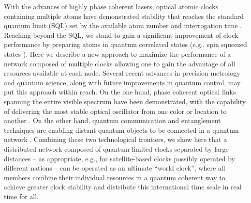  
With the advances of highly phase coherent lasers, optical atomic clocks
containing multiple atoms have demonstrated stability that reaches the standard
quantum limit (SQL) set by the available atom number 
and interrogation time
\cite{Bloom2014, Hinkley2013, Nicholson2012}.
Reaching beyond the SQL, we stand to gain a significant improvement of clock
performance by preparing atoms in quantum correlated states (e.g., spin squeezed
states \cite{Leroux2010, Buzek1999}). Here we describe a new
approach to maximize the performance of a network composed of multiple clocks allowing one to gain the
advantage of all resources available at each node.
Several recent advances in precision metrology and quantum science,
along with future improvements in quantum control,  
may put this
approach within reach.  On the
 one hand, 
 phase coherent
optical links spanning the entire visible spectrum 
have been demonstrated, with the capability of delivering the most
stable optical oscillator from one color or location to another \cite{Ye2003,
Droste2013}.
On the other hand, quantum communication and entanglement techniques are
enabling distant quantum objects to be connected in a quantum network
\cite{Cirac1997, Kimble2008, Perseguers2013}.
Combining these two technological frontiers, we show here that  a distributed
network composed of quantum-limited clocks separated by large distances -- as
appropriate, e.g., for satellite-based clocks possibly operated by different
nations -- can be operated  as an ultimate ``world clock'', where all members
combine their individual resources in a quantum coherent way  to achieve greater
clock stability and distribute this international time scale in real time for
all. 

